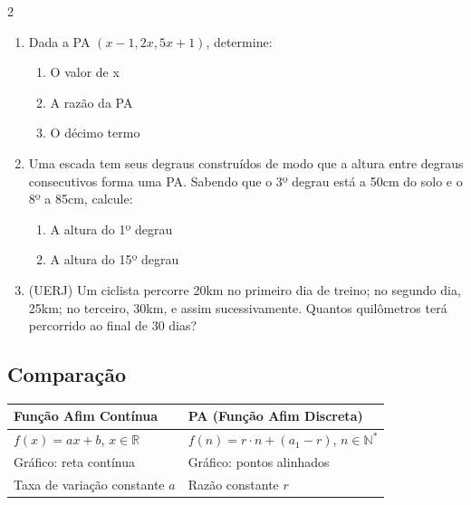 \documentclass[11pt]{article}
\begin{document}
\begin{multicols}{2}
\begin{enumerate}[leftmargin=*]
\item Dada a PA $(x-1, 2x, 5x+1)$, determine:
\begin{enumerate}[label=\alph*)]
\item O valor de x
\item A razão da PA
\item O décimo termo
\end{enumerate}

\item Uma escada tem seus degraus construídos de modo que a altura entre degraus consecutivos forma uma PA. Sabendo que o 3º degrau está a 50cm do solo e o 8º a 85cm, calcule:
\begin{enumerate}[label=\alph*)]
\item A altura do 1º degrau
\item A altura do 15º degrau
\end{enumerate}

\item (UERJ) Um ciclista percorre 20km no primeiro dia de treino; no segundo dia, 25km; no terceiro, 30km, e assim sucessivamente. Quantos quilômetros terá percorrido ao final de 30 dias?

\end{enumerate}

\subsection*{Comparação}
    {\footnotesize
\begin{tabular}{|l|l|}
\hline
\textbf{Função Afim Contínua} & \textbf{PA (Função Afim Discreta)} \\
\hline
$f(x) = ax + b$, $x \in \mathbb{R}$ & $f(n) = r \cdot n + (a_1 - r)$, $n \in \mathbb{N}^*$ \\
\hline
Gráfico: reta contínua & Gráfico: pontos alinhados \\
\hline
Taxa de variação constante $a$ & Razão constante $r$ \\
\hline
\end{tabular}
    }

\begin{center}
\end{center}



\end{multicols}
\end{document}
